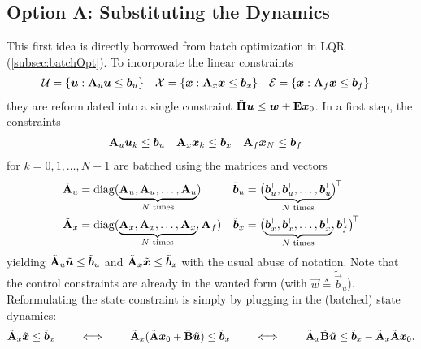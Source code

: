 		\subsection{Option A: Substituting the Dynamics}
			This first idea is directly borrowed from batch optimization in LQR (\autoref{subsec:batchOpt}). To incorporate the linear constraints
			\begin{align}
				\mathcal{U} & = \{ \bm{u} : \bm{\mathrm{A}}_u \bm{u} \leq \bm{b}_u \} &
				\mathcal{X} & = \{ \bm{x} : \bm{\mathrm{A}}_x \bm{x} \leq \bm{b}_x \} &
				\mathcal{E} & = \{ \bm{x} : \bm{\mathrm{A}}_f \bm{x} \leq \bm{b}_f \}
			\end{align}
			they are reformulated into a single constraint \( \tilde{\bm{\mathrm{H}}} \bm{u} \leq \bm{w} + \bm{\mathrm{E}} \bm{x}_0 \). In a first step, the constraints
			\begin{align}
				\bm{\mathrm{A}}_u \bm{u}_k & \leq \bm{b}_u &
				\bm{\mathrm{A}}_x \bm{x}_k & \leq \bm{b}_x &
				\bm{\mathrm{A}}_f \bm{x}_N & \leq \bm{b}_f
			\end{align}
			for \( k = 0, 1, \dots, N - 1 \) are batched using the matrices and vectors
			\begin{align}
				\tilde{\mat{A}}_u & = \diag(\underbrace{\mat{A}_u, \mat{A}_u, \dots, \mat{A}_u}_{N\text{ times}})                                                                             &
				\tilde{\vec{b}}_u & = \bigl(\underbrace{\vec{b}_u^\transposed, \vec{b}_u^\transposed, \dots, \vec{b}_u^\transposed}_{N\text{ times}}\bigr)^\transposed                          \\
				\tilde{\mat{A}}_x & = \diag(\underbrace{\mat{A}_x, \mat{A}_x, \dots, \mat{A}_x}_{N\text{ times}}, \mat{A}_f)                                                                  &
				\tilde{\vec{b}}_x & = \bigl(\underbrace{\vec{b}_x^\transposed, \vec{b}_x^\transposed, \dots, \vec{b}_x^\transposed}_{N\text{ times}}, \vec{b}_f^\transposed\bigr)^\transposed
			\end{align}
			yielding \( \tilde{\bm{\mathrm{A}}}_u \tilde{\bm{u}} \leq \tilde{\bm{b}}_u \) and \( \tilde{\bm{\mathrm{A}}}_x \tilde{\bm{x}} \leq \tilde{\bm{b}}_x \) with the usual abuse of notation. Note that the control constraints are already in the wanted form (with \( \vec{w} \triangleq \tilde{\vec{b}}_u \)). Reformulating the state constraint is simply by plugging in the (batched) state dynamics:
			\begin{equation}
				\tilde{\bm{\mathrm{A}}}_x \tilde{\bm{x}} \leq \tilde{\bm{b}}_x
				\qquad\iff\qquad
				\tilde{\bm{\mathrm{A}}}_x (\tilde{\bm{\mathrm{A}}} \bm{x}_0 + \tilde{\bm{\mathrm{B}}} \tilde{\bm{u}}) \leq \tilde{\bm{b}}_x
				\qquad\iff\qquad
				\tilde{\bm{\mathrm{A}}}_x \tilde{\bm{\mathrm{B}}} \tilde{\bm{u}} \leq \tilde{\bm{b}}_x - \tilde{\bm{\mathrm{A}}}_x \tilde{\bm{\mathrm{A}}} \bm{x}_0.
			\end{equation}
